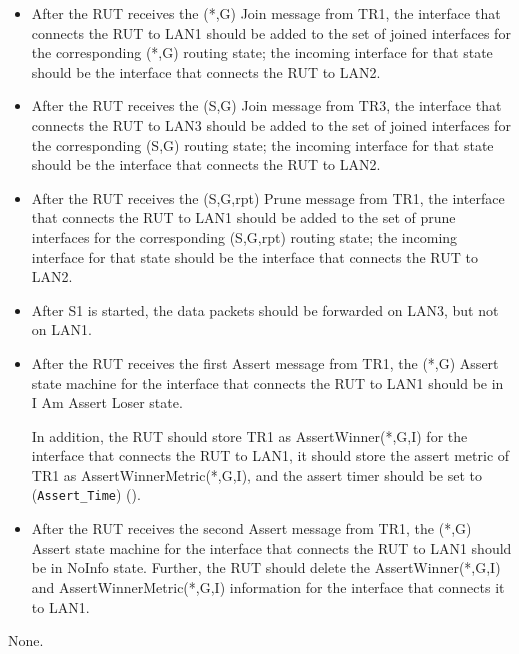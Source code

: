\documentclass[11pt]{report}
\begin{document}

\begin{itemize}

  \item After the RUT receives the (*,G) Join message from TR1, the
  interface that connects the RUT to LAN1 should be
  added to the set of joined interfaces for the corresponding (*,G)
  routing state; the incoming interface for that state should be the
  interface that connects the RUT to LAN2.

  \item After the RUT receives the (S,G) Join message from TR3, the
  interface that connects the RUT to LAN3 should be
  added to the set of joined interfaces for the corresponding (S,G)
  routing state; the incoming interface for that state should be the
  interface that connects the RUT to LAN2.

  \item After the RUT receives the (S,G,rpt) Prune message from TR1, the
  interface that connects the RUT to LAN1 should be
  added to the set of prune interfaces for the corresponding (S,G,rpt)
  routing state; the incoming interface for that state should be the
  interface that connects the RUT to LAN2.

  \item After S1 is started, the data packets should be forwarded on LAN3, but
  not on LAN1.

  \item After the RUT receives the first Assert message from TR1, the (*,G)
  Assert state machine for the interface that connects the RUT to LAN1 should
  be in I Am Assert Loser state.

  In addition, the RUT should store TR1 as AssertWinner(*,G,I) for the
  interface that connects the RUT to LAN1, it should store the assert metric
  of TR1 as AssertWinnerMetric(*,G,I), and the assert timer should be set to
  (\verb=Assert_Time=) ({\PimsmAssertTime}).

  \item After the RUT receives the second Assert message from TR1, the (*,G)
  Assert state machine for the interface that connects the RUT to LAN1 should
  be in NoInfo state.
  Further, the RUT should delete the AssertWinner(*,G,I) and
  AssertWinnerMetric(*,G,I) information for the interface that connects it to
  LAN1.

\end{itemize}

None.
\end{document}
